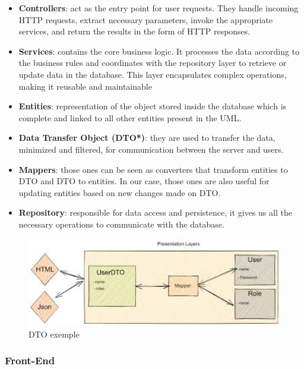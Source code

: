 \documentclass[12pt,a4paper,table,english]{article}
\begin{document}
	\begin{itemize}
		\item \textbf{Controllers}: act as the entry point for user requests. They handle incoming HTTP requests, extract necessary parameters, invoke the appropriate services, and return the results in the form of HTTP responses.

		
		\item \textbf{Services}: contains the core business logic. It processes the data according to the business rules and coordinates with the repository layer to retrieve or update data in the database. This layer encapsulates complex operations, making it reusable and maintainable
		
		 
		\item \textbf{Entities}: representation of the object stored inside the database which is complete and linked to all other entities present in the UML.
		
		\item \textbf{Data Transfer Object (DTO*)}: they are used to transfer the data, minimized and filtered, for communication between the server and users.
		 
		\item \textbf{Mappers}: those ones can be seen as converters that transform entities to DTO and DTO to entities. In our case, those ones are also useful for updating entities based on new changes made on DTO.
		
		\item \textbf{Repository}: responsible for data access and persistence, it gives us all the necessary operations to communicate with the database.
		
	\end{itemize}

	\begin{figure}[H]
		\centering
		\includegraphics[width=150mm]{Image/dto}
		\caption{DTO exemple}
		\label{fig:DTO exemple}
	\end{figure}	
	
	\newpage
	\subsubsection{Front-End}
		
\end{document}
